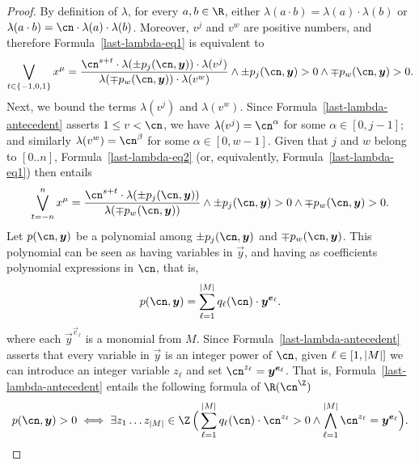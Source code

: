 \begin{proof}
    By definition of $\lambda$, for every $a,b \in \R$, either $\lambda(a \cdot b) = \lambda(a) \cdot \lambda(b)$ or $\lambda(a \cdot b) = \cn \cdot \lambda(a) \cdot \lambda(b)$.
    Moreover, $v^j$ and $v^w$ are positive numbers, and therefore Formula~\eqref{last-lambda-eq1}
    is equivalent to 
    \begin{equation}\label{last-lambda-eq2}
      \bigvee_{t \in \{-1,0,1\}} x^\mu=\frac{\cn^{s+t}\cdot \lambda(\pm p_j(\cn,\vec y)) \cdot \lambda(v^j)}
      {\lambda(\mp p_w(\cn,\vec y)) \cdot \lambda(v^w)}
      \land \pm p_j(\cn,\vec y) > 0 
      \land \mp p_w(\cn,\vec y) > 0.
    \end{equation}
    Next, we bound the terms $\lambda(v^j)$ and $\lambda(v^w)$. 
    Since Formula~\eqref{last-lambda-antecedent} asserts $1 \leq v < \cn$,
    we have $\lambda(v^j) = \cn^{\alpha}$ for some $\alpha \in [0,j-1]$; 
    and similarly $\lambda(v^w) = \cn^{\beta}$ for some $\alpha \in [0,w-1]$.
    Given that $j$ and $w$ belong to $[0..n]$, 
    Formula~\eqref{last-lambda-eq2} (or, equivalently, Formula~\eqref{last-lambda-eq1}) then entails
    \begin{equation}\label{last-lambda-eq3}
      \bigvee_{t=-n}^n
      x^\mu=\frac{\cn^{s+t} \cdot \lambda(\pm p_j(\cn,\vec y))}
      {\lambda(\mp p_w(\cn,\vec y))}
      \land \pm p_j(\cn,\vec y) > 0 
      \land \mp p_w(\cn,\vec y) > 0.
    \end{equation}
    Let $p(\cn,\vec y)$ be a polynomial among $\pm p_j(\cn,\vec y)$ and $\mp p_w(\cn,\vec y)$.
    This polynomial can be seen as having variables in $\vec y$, and having as coefficients polynomial expressions in $\cn$, that is,
    \begin{equation*}
      p(\cn,\vec y)= \sum_{\ell=1}^{\abs{M}} q_{\ell}(\cn) \cdot \vec{y}^{\vec{e}_\ell}.
    \end{equation*}
    where each $\vec{y}^{\vec{e}_\ell}$ is a monomial from $M$.
    Since Formula~\eqref{last-lambda-antecedent} asserts that every variable in $\vec y$ 
    is an integer power of $\cn$, given $\ell \in [1,\left|M\right|]$ we can introduce an integer variable $z_\ell$ and set $\cn^{z_\ell} = \vec{y}^{\vec{e}_\ell}$. That is, Formula~\eqref{last-lambda-antecedent} entails the following formula of $\R(\ipow{\cn})$
    \begin{equation}\label{last-lambda-eq4}
      p(\cn, \vec y) > 0 
      \iff \exists z_1 \dots z_{\abs{M}} \in \Z \,
        \Big( \sum_{\ell=1}^{\abs{M}} q_{\ell}(\cn) \cdot \cn^{z_\ell} > 0 \land \bigwedge_{\ell=1}^{\abs{M}} \cn^{z_\ell} = \vec{y}^{\vec{e}_\ell} \Big).

\end{equation}
\end{proof}
